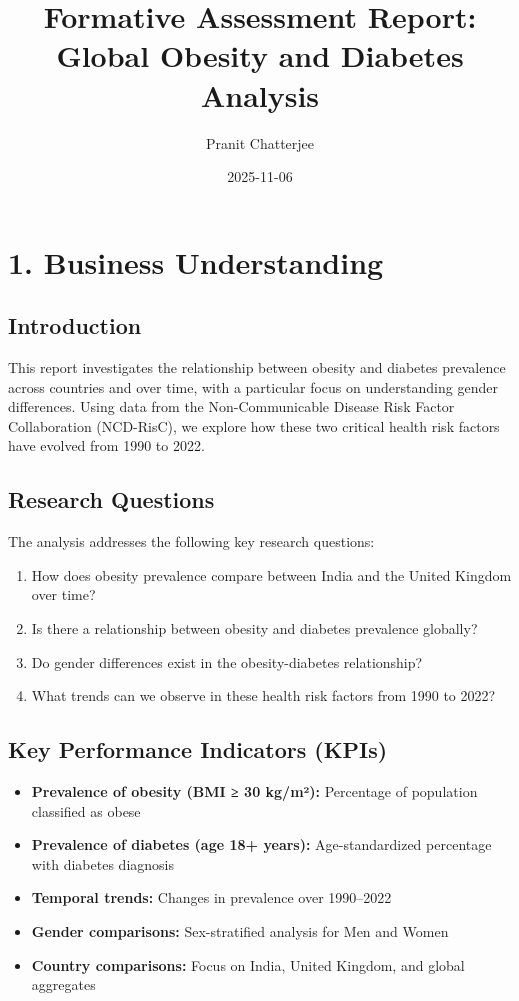 \documentclass[
]{article}
\title{Formative Assessment Report: Global Obesity and Diabetes
Analysis}
\author{Pranit Chatterjee}
\date{2025-11-06}
\providecommand{\tightlist}{%
  \setlength{\itemsep}{0pt}\setlength{\parskip}{0pt}}
\begin{document}
\maketitle

\section{1. Business Understanding}\label{business-understanding}

\subsection{Introduction}\label{introduction}

This report investigates the relationship between obesity and diabetes
prevalence across countries and over time, with a particular focus on
understanding gender differences. Using data from the Non-Communicable
Disease Risk Factor Collaboration (NCD-RisC), we explore how these two
critical health risk factors have evolved from 1990 to 2022.

\subsection{Research Questions}\label{research-questions}

The analysis addresses the following key research questions:

\begin{enumerate}
\def\labelenumi{\arabic{enumi}.}
\tightlist
\item
  How does obesity prevalence compare between India and the United
  Kingdom over time?
\item
  Is there a relationship between obesity and diabetes prevalence
  globally?
\item
  Do gender differences exist in the obesity-diabetes relationship?
\item
  What trends can we observe in these health risk factors from 1990 to
  2022?
\end{enumerate}

\subsection{Key Performance Indicators
(KPIs)}\label{key-performance-indicators-kpis}

\begin{itemize}
\tightlist
\item
  \textbf{Prevalence of obesity (BMI ≥ 30 kg/m²):} Percentage of
  population classified as obese
\item
  \textbf{Prevalence of diabetes (age 18+ years):} Age-standardized
  percentage with diabetes diagnosis
\item
  \textbf{Temporal trends:} Changes in prevalence over 1990--2022
\item
  \textbf{Gender comparisons:} Sex-stratified analysis for Men and Women
\item
  \textbf{Country comparisons:} Focus on India, United Kingdom, and
  global aggregates
\end{itemize}
\end{document}
